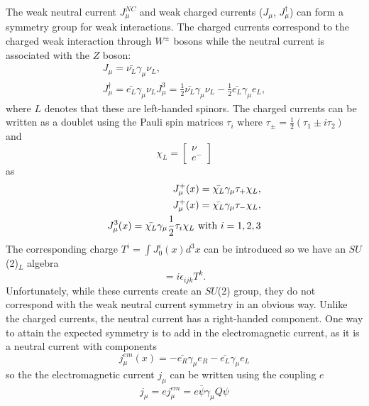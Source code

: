 The weak neutral current $J_\mu^{NC}$ and weak charged currents ($J_\mu$, $J_\mu^\dagger$) can form a symmetry group for weak interactions. The charged currents correspond to the charged weak interaction through $W^\pm$ bosons while the neutral current is associated with the $Z$ boson:
\begin{equation}
\begin{split}
J_\mu=\bar{\nu_L}\gamma_\mu\nu_L, \\
J_\mu^\dagger =\bar{e_L}\gamma_\mu\nu_L
J_\mu^3=\frac{1}{2}\bar{\nu_L}\gamma_\mu\nu_L-\frac{1}{2}\bar{e_L}\gamma_\mu e_L,
\end{split}
\end{equation}
where $L$ denotes that these are left-handed spinors. The charged currents can be written as a doublet using the Pauli spin matrices $\tau_i$ where $\tau_\pm=\frac{1}{2}(\tau_1\pm i\tau_2)$ and
\begin{equation}
\chi_L=\begin{bmatrix}
        \nu  \\
        e^-
        \end{bmatrix}
\end{equation}
as 
\begin{equation}
\begin{split}
J_\mu^+(x)=\bar{\chi_L}\gamma_\mu\tau_+\chi_L, \\
J_\mu^+(x)=\bar{\chi_L}\gamma_\mu\tau_-\chi_L, \\
J_\mu^3(x)=\bar{\chi_L}\gamma_\mu\frac{1}{2}\tau_i\chi_L \textnormal{ with } i=1,2,3
\end{split}
\end{equation}
The corresponding charge $T^i=\int J_0^i(x)d^3x$ can be introduced so we have an $SU$(2)$_L$ algebra
\begin{equation}
[T^i,T^j]=i\epsilon_{ijk}T^k.
\end{equation}
Unfortunately, while these currents create an $SU$(2) group, they do not correspond with the weak neutral current symmetry in an obvious way. Unlike the charged currents, the neutral current has a right-handed component. One way to attain the expected symmetry is to add in the electromagnetic current, as it is a neutral current with components
\begin{equation} 
j_\mu^{em}(x)=-\bar{e_R}\gamma_\mu e_R-\bar{e_L}\gamma_\mu e_L
\end{equation}
so the the electromagnetic current $j_\mu$ can be written using the coupling $e$
\begin{equation}
j_\mu=e j_\mu^{em} = e\bar{\psi}\gamma_\mu Q\psi
\end{equation}
